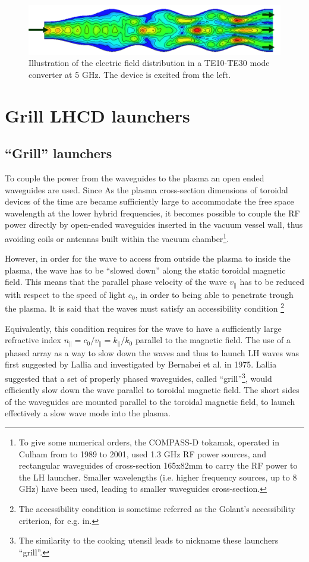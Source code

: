 \begin{figure}
\centering
\includegraphics[width=0.9\linewidth]{Figures/LHCD/ModeConverter}
\caption{Illustration of the electric field distribution in a TE10-TE30 mode converter at 5 GHz. The device is excited from the left.}
\label{fig:modeconverter}
\end{figure}


\section{Grill LHCD launchers}
\subsection{“Grill” launchers}
To couple the power from the waveguides to the plasma an open ended waveguides are used. Since As the plasma cross-section dimensions of toroidal devices of the time are became sufficiently large to accommodate the free space wavelength at the lower hybrid frequencies, it becomes possible to couple the RF power directly by open-ended waveguides inserted in the vacuum vessel wall, thus avoiding coils or antennas built within the vacuum chamber\footnote{To give some numerical orders, the COMPASS-D tokamak, operated in Culham from to 1989 to 2001, used 1.3 GHz RF power sources, and rectangular waveguides of cross-section 165x82mm to carry the RF power to the LH launcher. Smaller wavelengths (i.e. higher frequency sources, up to 8 GHz) have been used, leading to smaller waveguides cross-section.}.
 
However, in order for the wave to access from outside the plasma to inside the plasma, the wave has to be “slowed down” along the static toroidal magnetic field. This means that the parallel phase velocity of the wave $v_{\parallel}$ has to be reduced with respect to the speed of light $c_0$, in order to being able to penetrate trough the plasma. It is said that the waves must satisfy an accessibility condition \parencite{Golant1972, Stix1992}\footnote{The accessibility condition is sometime referred as the Golant's accessibility criterion, for e.g. in\parencite{Puri1974}.}

Equivalently, this condition requires for the wave to have a sufficiently large refractive index $n_{\parallel} = c_0/v_{\parallel} = k_{\parallel}/k_0$ parallel to the magnetic field. The use of a phased array as a way to slow down the waves and thus to launch LH waves was first suggested by Lallia\parencite{Lallia1975} and investigated by Bernabei et al. in 1975\parencite{Bernabei1975}. Lallia suggested that a set of properly phased waveguides, called “grill”\footnote{The similarity to the cooking utensil leads to nickname these launchers “grill”.}, would efficiently slow down the wave parallel to toroidal magnetic field. The short sides of the waveguides are mounted parallel to the toroidal magnetic field, to launch effectively a slow wave mode into the plasma. 

